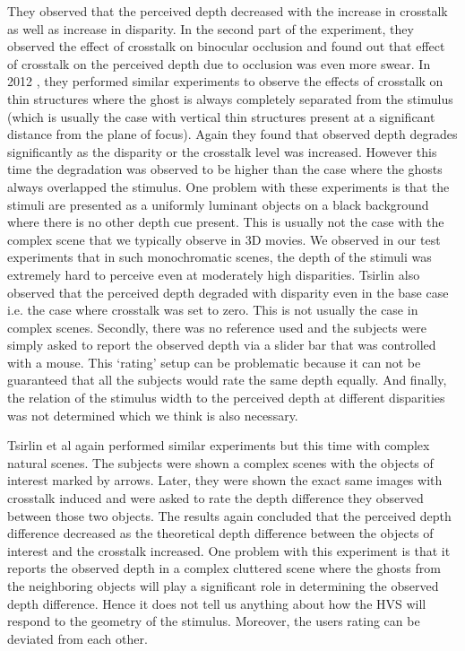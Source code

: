 They observed that the perceived depth decreased with the increase in crosstalk as well as increase in disparity. In the second part of the experiment, they observed the effect of crosstalk on binocular occlusion and found out that effect of crosstalk on the perceived depth due to occlusion was even more swear. In 2012 \cite{tsirlin2012effect}, they performed similar experiments to observe the effects of crosstalk on thin structures where the ghost is always completely separated from the stimulus (which is usually the case with vertical thin structures present at a significant distance from the plane of focus). Again they found that observed depth degrades significantly as the disparity or the crosstalk level was increased. However this time the degradation was observed to be higher than the case where the ghosts always overlapped the stimulus. One problem with these experiments is that the stimuli are presented as a uniformly luminant objects on a black background where there is no other depth cue present. This is usually not the case with the complex scene that we typically observe in 3D movies. We observed in our test experiments that in such monochromatic scenes, the depth of the stimuli was extremely hard to perceive even at moderately high disparities. Tsirlin also observed that the perceived depth degraded with disparity even in the base case i.e. the case where crosstalk was set to zero. This is not usually the case in complex scenes. Secondly, there was no reference used and the subjects were simply asked to report the observed depth via a slider bar that was controlled with a mouse. This `rating' setup can be problematic because it can not be guaranteed that all the subjects would rate the same depth equally. And finally, the relation of the stimulus width to the perceived depth at different disparities was not determined which we think is also necessary.

Tsirlin et al \cite{tsirlin2012crosstalk} again performed similar experiments but this time with complex natural scenes. The subjects were shown a complex scenes with the objects of interest marked by arrows. Later, they were shown the exact same images with crosstalk induced and were asked to rate the depth difference they observed between those two objects. The results again concluded that the perceived depth difference decreased as the theoretical depth difference between the objects of interest and the crosstalk increased. One problem with this experiment is that it reports the observed depth in a complex cluttered scene where the ghosts from the neighboring objects will play a significant role in determining the observed depth difference. Hence it does not tell us anything about how the HVS will respond to the geometry of the stimulus. Moreover, the users rating can be deviated from each other.

